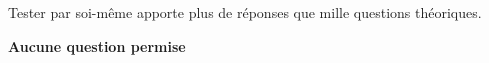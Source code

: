\thispagestyle{empty} 
\begin{center}

  \vfill

  \vspace{5cm}

  {\huge Tester par soi-même apporte plus de réponses que mille 
  questions théoriques.}

  \vfill

  {\Large \textcolor{red!50!black}{\textbf{Aucune question permise}}}
\end{center}

\clearpage
